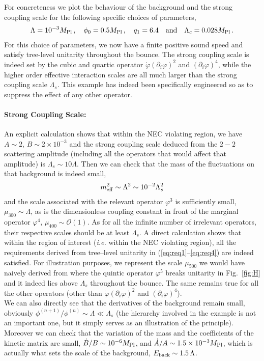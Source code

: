 \documentclass[12pt]{article}
\def\ba{\begin{eqnarray}}
\def\ea{\end{eqnarray}}
\def\mpl{M_{\rm Pl}}
\def\ie{{\it i.e. }}
\def\p{\partial}
\def\p{\partial}
\begin{document}
For concreteness we plot the behaviour of the background and the strong coupling scale for the following specific choices of parameters,
\ba
\Lambda=10^{-3}\mpl\,,\quad \phi_0=0.5 \mpl\,,\quad q_1=6.4\quad {\rm and }\quad
\Lambda_c = 0.028 \mpl\,.
\ea
 For this choice of parameters,  we now have a finite positive sound speed and satisfy tree-level unitarity throughout the bounce. The strong coupling scale is indeed set by the cubic and quartic operator $\dot \varphi (\p_i\varphi)^2$ and $(\p_i\varphi)^4$, while the higher order effective interaction scales are all much larger than the strong coupling scale $\Lambda_s$. This example has indeed been specifically engineered so as to suppress the effect of any other operator.\\

\paragraph{Strong Coupling Scale:}
  An explicit calculation shows that within the NEC violating region, we have $A\sim 2$, $B\sim 2\times 10^{-3}$ and the strong coupling scale deduced from the $2-2$ scattering amplitude (including all the operators that would affect that amplitude) is $\Lambda_s\sim 10 \Lambda$. Then we can check that the mass of the fluctuations on that background is indeed small,
  \ba
  m^2_{\rm eff} \sim  \Lambda^2 \sim  10^{-2}\Lambda_s^2
  \ea
and the scale associated with the relevant operator $\varphi^3$ is sufficiently small, $\mu_{300}\sim  \Lambda$, as is the dimensionless coupling constant in front of the marginal operator $\varphi^4$, $\mu_{400}\sim \mathcal{O}(1)$. As for all the infinite number of irrelevant operators, their respective scales should be at least $\Lambda_s$. A direct calculation shows that within the region of interest (\ie within the NEC violating region), all the requirements derived from tree--level unitarity in (\ref{eq:req1}--\ref{eq:req4}) are indeed satisfied. For illustration purposes, we represent the scale $\mu_{500}$ we would have naively derived from where the quintic operator $\varphi^5$ breaks unitarity in Fig.~\ref{fig:H} and it indeed lies above $\Lambda_s$ throughout the bounce. The same remains true for all the other operators (other than $\dot \varphi (\p_i \varphi)^2$ and $(\p_i \varphi)^4$). \\

We can also directly see that the derivatives of the background remain small, obviously $\phi^{(n+1)}/\phi^{(n)} \sim \Lambda \ll \Lambda_s$ (the hierarchy involved in the example is not an important one, but it simply serves as an illustration of the principle). Moreover we can check that the variation of the mass and the coefficients of the kinetic matrix are small, $\dot B / B \sim 10^{-6}\mpl$, and $\dot A /A \sim 1.5 \times 10^{-3}\mpl$, which is actually what sets the scale of the background, $E_{\rm back}\sim 1.5\,  \Lambda$.  \\
\end{document}
